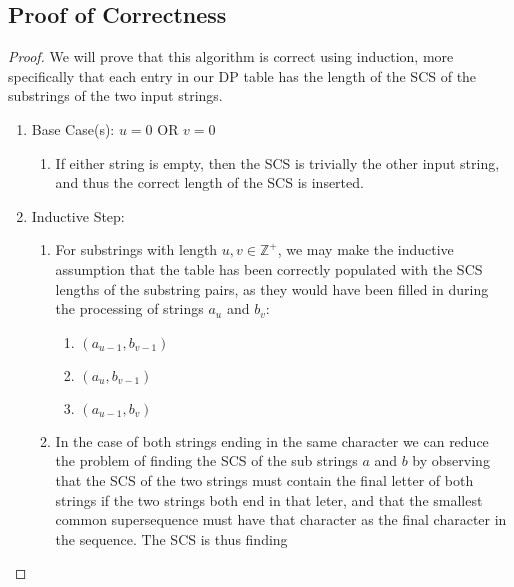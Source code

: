 \documentclass{article}
\newcommand{\ZZ}{\mathbb{Z}} %
\begin{document}
\subsection{Proof of Correctness}
\begin{proof}
      We will prove that this algorithm is correct using induction, more specifically that
      each entry in our DP table has the length of the SCS of the substrings of the two
      input strings.
      \begin{enumerate}
            \item Base Case(s): $u = 0$ OR $v = 0$
                  \begin{enumerate}
                        \item If either string is empty, then the SCS is trivially the
                              other input string, and thus the correct length of the SCS
                              is inserted.
                  \end{enumerate}
            \item Inductive Step:
                  \begin{enumerate}
                        \item For substrings with length $u,v \in \ZZ^+$, we may make the
                              inductive assumption that the table has been correctly
                              populated with the SCS lengths of the substring pairs, as
                              they would have been filled in during the processing of
                              strings $a_u$ and $b_v$:
                              \begin{enumerate}
                                    \item $(a_{u-1}, b_{v-1})$
                                    \item $(a_u,b_{v-1})$
                                    \item $(a_{u-1},b_v)$
                              \end{enumerate}
                        \item In the case of both strings ending in the same character we can reduce the problem of finding the SCS of the sub
                              strings $a$ and $b$ by observing that the SCS of the two
                              strings must contain the final letter of both strings if the two strings both end in that leter, and that the
                              smallest common supersequence must have that character as
                              the final character in the sequence. The SCS is thus finding

\end{enumerate}
\end{enumerate}
\end{proof}
\end{document}

